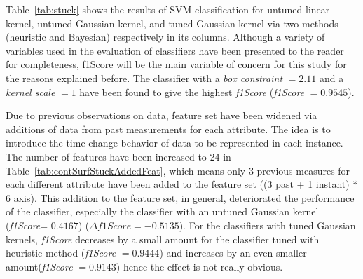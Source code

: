 




Table~\ref{tab:stuck} shows the results of SVM classification for untuned linear kernel, untuned Gaussian kernel, and tuned Gaussian kernel via two methods (heuristic and Bayesian) respectively in its columns.  
Although a variety of variables used in the evaluation of classifiers have been presented to the reader for completeness, f1Score will be the main variable of concern for this study for the reasons explained before. 
The classifier with a \emph{box constraint} $= 2.11$ and a \emph{kernel scale} $ = 1$ have been found to give the highest \emph{f1Score} (\emph{f1Score} $= 0.9545$). 

Due to previous observations on data, feature set have been widened via additions of data from past measurements for each attribute. 
The idea is to introduce the time change behavior of data to be represented in each instance. 
The number of features have been increased to 24 in Table~\ref{tab:contSurfStuckAddedFeat}, which means only 3 previous measures for each different attribute have been added to the feature set ((3 past + 1 instant) * 6 axis).
This addition to the feature set, in general, deteriorated the performance of the classifier, especially the classifier with an untuned Gaussian kernel (\emph{f1Score}= $0.4167$) ($\Delta f1Score = -0.5135$). 
For the classifiers with tuned Gaussian kernels, \emph{f1Score} decreases by a small amount for the classifier tuned with heuristic method (\emph{f1Score} $= 0.9444$) and increases by an even smaller amount(\emph{f1Score} $= 0.9143$) hence the effect is not really obvious. 


